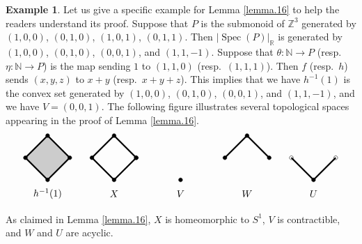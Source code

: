 \documentclass[10pt]{amsart}
\theoremstyle{definition}
\newtheorem{exm}[thm]{Example}
\theoremstyle{remark}
\numberwithin{equation}{subsection}
\newcommand{\N}{\mathbb{N}}
\newcommand{\R}{\mathbb{R}}
\newcommand{\Z}{\mathbb{Z}}
\DeclareMathOperator{\Spec}{Spec}
\begin{document}
\begin{exm}
Let us give a specific example for Lemma \ref{lemma.16} to help the readers understand its proof.
Suppose that $P$ is the submonoid of $\Z^3$ generated by $(1,0,0)$, $(0,1,0)$, $(1,0,1)$, $(0,1,1)$.
Then $|\Spec(P)|_{\R}$ is generated by $(1,0,0)$, $(0,1,0)$, $(0,0,1)$, and $(1,1,-1)$.
Suppose that $\theta\colon \N\to P$ (resp.\ $\eta\colon \N\to P$) is the map sending $1$ to $(1,1,0)$ (resp.\ $(1,1,1)$).
Then $f$ (resp.\ $h$) sends $(x,y,z)$ to $x+y$ (resp.\ $x+y+z$).
This implies that we have $h^{-1}(1)$ is the convex set generated by $(1,0,0)$, $(0,1,0)$, $(0,0,1)$, and $(1,1,-1)$,
and we have $V=(0,0,1)$.
The following figure illustrates several topological spaces appearing in the proof of Lemma \ref{lemma.16}.
\[
\begin{tikzpicture}
\fill[black!20] (0.8,0)--(0,0.8)--(-0.8,0)--(0,-0.8);
\draw[ultra thick] (0.8,0)--(0,0.8)--(-0.8,0)--(0,-0.8)--(0.8,0);
\filldraw (0.8,0) circle (2pt);
\filldraw (0,0.8) circle (2pt);
\filldraw (-0.8,0) circle (2pt);
\filldraw (0,-0.8) circle (2pt);
\node at (0,-1.3) {$h^{-1}(1)$};
\draw[ultra thick] (3.2,0)--(2.4,0.8)--(1.6,0)--(2.4,-0.8)--(3.2,0);
\filldraw (3.2,0) circle (2pt);
\filldraw (2.4,0.8) circle (2pt);
\filldraw (1.6,0) circle (2pt);
\filldraw (2.4,-0.8) circle (2pt);
\filldraw (3.2,0) circle (2pt);
\node at (2.4,-1.3) {$X$};
\filldraw (4.8,-0.8) circle (2pt);
\node at (4.8,-1.3) {$V$};
\draw[ultra thick] (8,0)--(7.2,0.8)--(6.4,0);
\filldraw (8,0) circle (2pt);
\filldraw (7.2,0.8) circle (2pt);
\filldraw (6.4,0) circle (2pt);
\node at (7.2,-1.3) {$W$};
\draw[ultra thick] (10.4,0)--(9.6,-0.8)--(8.8,0);
\draw (10.4,0) circle (2pt);
\filldraw (9.6,-0.8) circle (2pt);
\draw (8.8,0) circle (2pt);
\node at (9.6,-1.3) {$U$};
\end{tikzpicture}
\]
As claimed in Lemma \ref{lemma.16},
$X$ is homeomorphic to $S^1$,
$V$ is contractible,
and $W$ and $U$ are acyclic.
\end{exm}
\end{document}
